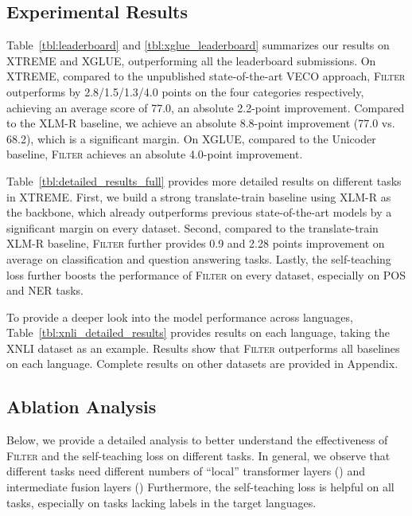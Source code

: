 \subsection{Experimental Results}
Table~\ref{tbl:leaderboard} and \ref{tbl:xglue_leaderboard} summarizes our results on XTREME and XGLUE, outperforming all the leaderboard submissions.
On XTREME, compared to the unpublished state-of-the-art VECO approach, \textsc{Filter} outperforms by 2.8/1.5/1.3/4.0 points on the four categories respectively, achieving an average score of 77.0, an absolute 2.2-point improvement.
Compared to the XLM-R baseline, we achieve an absolute 8.8-point improvement (77.0 vs. 68.2), which is a significant margin. On XGLUE, compared to the Unicoder baseline, \textsc{Filter} achieves an absolute 4.0-point improvement.

Table~\ref{tbl:detailed_results_full} provides more detailed results on different tasks in XTREME.
First, we build a strong translate-train baseline using XLM-R as the backbone, which already outperforms previous state-of-the-art models by a significant margin on every dataset.
Second, compared to the translate-train XLM-R baseline, \textsc{Filter} further provides 0.9 and 2.28 points improvement on average on classification and question answering tasks.
Lastly, the self-teaching loss further boosts the performance of \textsc{Filter} on every dataset, especially on POS and NER tasks.


To provide a deeper look into the model performance across languages, Table~\ref{tbl:xnli_detailed_results} provides results on each language, taking the XNLI dataset as an example. Results show that \textsc{Filter} outperforms all baselines on each language.
Complete results on other datasets are provided in Appendix.

\subsection{Ablation Analysis}
Below, we provide a detailed analysis to better understand the effectiveness of \textsc{Filter} and the self-teaching loss on different tasks. 
In general, we observe that different tasks need different numbers of ``local'' transformer layers () and
intermediate fusion layers ()
Furthermore, the self-teaching loss is helpful on all tasks, especially on tasks lacking labels in the target languages.

